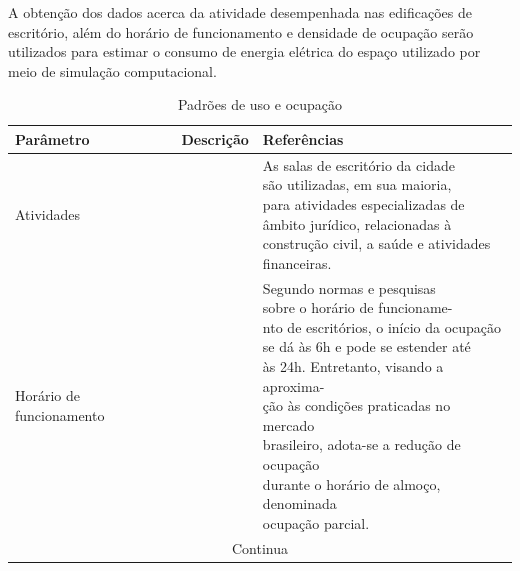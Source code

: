 \noindent A obtenção dos dados acerca da atividade desempenhada nas edificações de escritório, além do 
horário de funcionamento e densidade de ocupação serão utilizados para estimar o consumo de 
energia elétrica do espaço utilizado por meio de simulação computacional.
\begin{table}[ht]\centering
    \caption{\small Padrões de uso e ocupação}
    \vspace*{0.5cm}
    \label{tab:tabela5}
    \begin{tabular*}{\columnwidth}{@{\extracolsep{\fill}}lll}
        \hline
        \textbf{Parâmetro}                                & \textbf{Descrição} & \textbf{Referências} \\ \hline
        Atividades                                        &                    & \makecell[l]{As salas de escritório da cidade\\
                                                                                são utilizadas, em sua maioria,\\ para 
                                                                                atividades especializadas de\\ âmbito 
                                                                                jurídico, relacionadas à \\construção 
                                                                                civil, a saúde e atividades\\ financeiras.} \\ \hline
        Horário de funcionamento                          &                    & \makecell[l]{Segundo normas e pesquisas\\ 
                                                                                sobre o horário de funcioname-\\nto de 
                                                                                escritórios, o início da ocupação\\ se 
                                                                                dá às 6h e pode se estender até\\ às 24h. 
                                                                                Entretanto, visando a aproxima-\\ção às 
                                                                                condições praticadas no mercado\\ brasileiro, 
                                                                                adota-se a redução de ocupação\\ durante o 
                                                                                horário de almoço, denominada\\ ocupação parcial.}  \\ \hline
        \multicolumn{3}{c}{Continua}\\\hline
    \end{tabular*}
\end{table}\pagebreak
